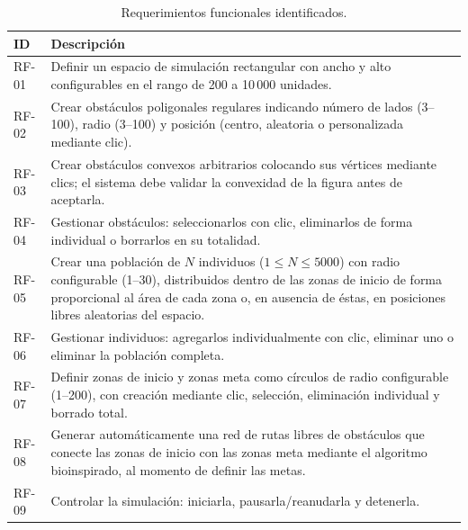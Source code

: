 \documentclass[12pt,a4paper]{article}
\begin{document}
\begin{table}[H]
    \centering
    \caption{Requerimientos funcionales identificados.}
    \label{tab:requerimientos_funcionales}
    \begin{tabularx}{\textwidth}{p{2.2cm} X}
        \toprule
        \textbf{ID} & \textbf{Descripción} \\
        \midrule

        RF-01 &
        Definir un espacio de simulación rectangular con ancho y alto configurables en el rango de 200 a 10\,000 unidades. \\

        RF-02 &
        Crear obstáculos poligonales regulares indicando número de lados (3--100), radio (3--100) y posición (centro, aleatoria o personalizada mediante clic). \\

        RF-03 &
        Crear obstáculos convexos arbitrarios colocando sus vértices mediante clics; el sistema debe validar la convexidad de la figura antes de aceptarla. \\

        RF-04 &
        Gestionar obstáculos: seleccionarlos con clic, eliminarlos de forma individual o borrarlos en su totalidad. \\

        RF-05 &
        Crear una población de $N$ individuos ($1 \le N \le 5000$) con radio configurable (1--30), distribuidos dentro de las zonas de inicio de forma proporcional al área de cada zona o, en ausencia de éstas, en posiciones libres aleatorias del espacio. \\

        RF-06 &
        Gestionar individuos: agregarlos individualmente con clic, eliminar uno o eliminar la población completa. \\

        RF-07 &
        Definir zonas de inicio y zonas meta como círculos de radio configurable (1--200), con creación mediante clic, selección, eliminación individual y borrado total. \\

        RF-08 &
        Generar automáticamente una red de rutas libres de obstáculos que conecte las zonas de inicio con las zonas meta mediante el algoritmo bioinspirado, al momento de definir las metas. \\

        RF-09 &
        Controlar la simulación: iniciarla, pausarla/reanudarla y detenerla. \\


\end{tabularx}
\end{table}
\end{document}
